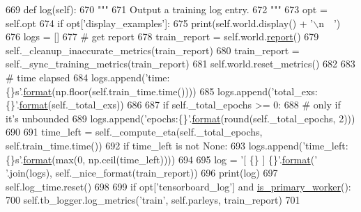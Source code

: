 \begin{DoxyCode}
669     \textcolor{keyword}{def }log(self):
670         \textcolor{stringliteral}{"""}
671 \textcolor{stringliteral}{        Output a training log entry.}
672 \textcolor{stringliteral}{        """}
673         opt = self.opt
674         \textcolor{keywordflow}{if} opt[\textcolor{stringliteral}{'display\_examples'}]:
675             print(self.world.display() + \textcolor{stringliteral}{'\(\backslash\)n~~'})
676         logs = []
677         \textcolor{comment}{# get report}
678         train\_report = self.world.\hyperlink{namespaceprojects_1_1convai2_1_1eval__f1_a01a47b9c08dad189837a51f085defc45}{report}()
679         self.\_cleanup\_inaccurate\_metrics(train\_report)
680         train\_report = self.\_sync\_training\_metrics(train\_report)
681         self.world.reset\_metrics()
682 
683         \textcolor{comment}{# time elapsed}
684         logs.append(\textcolor{stringliteral}{'time:\{\}s'}.\hyperlink{namespaceparlai_1_1chat__service_1_1services_1_1messenger_1_1shared__utils_a32e2e2022b824fbaf80c747160b52a76}{format}(np.floor(self.train\_time.time())))
685         logs.append(\textcolor{stringliteral}{'total\_exs:\{\}'}.\hyperlink{namespaceparlai_1_1chat__service_1_1services_1_1messenger_1_1shared__utils_a32e2e2022b824fbaf80c747160b52a76}{format}(self.\_total\_exs))
686 
687         \textcolor{keywordflow}{if} self.\_total\_epochs >= 0:
688             \textcolor{comment}{# only if it's unbounded}
689             logs.append(\textcolor{stringliteral}{'epochs:\{\}'}.\hyperlink{namespaceparlai_1_1chat__service_1_1services_1_1messenger_1_1shared__utils_a32e2e2022b824fbaf80c747160b52a76}{format}(round(self.\_total\_epochs, 2)))
690 
691         time\_left = self.\_compute\_eta(self.\_total\_epochs, self.train\_time.time())
692         \textcolor{keywordflow}{if} time\_left \textcolor{keywordflow}{is} \textcolor{keywordflow}{not} \textcolor{keywordtype}{None}:
693             logs.append(\textcolor{stringliteral}{'time\_left:\{\}s'}.\hyperlink{namespaceparlai_1_1chat__service_1_1services_1_1messenger_1_1shared__utils_a32e2e2022b824fbaf80c747160b52a76}{format}(max(0, np.ceil(time\_left))))
694 
695         log = \textcolor{stringliteral}{'[ \{\} ] \{\}'}.\hyperlink{namespaceparlai_1_1chat__service_1_1services_1_1messenger_1_1shared__utils_a32e2e2022b824fbaf80c747160b52a76}{format}(\textcolor{stringliteral}{' '}.join(logs), self.\_nice\_format(train\_report))
696         print(log)
697         self.log\_time.reset()
698 
699         \textcolor{keywordflow}{if} opt[\textcolor{stringliteral}{'tensorboard\_log'}] \textcolor{keywordflow}{and} \hyperlink{namespaceparlai_1_1utils_1_1distributed_a9bb1dac198180590ef8c6b6c6f9fc2c4}{is\_primary\_worker}():
700             self.tb\_logger.log\_metrics(\textcolor{stringliteral}{'train'}, self.parleys, train\_report)
701 
\end{DoxyCode}
